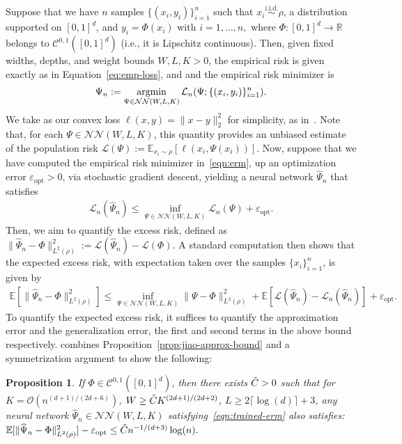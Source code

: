 \documentclass[11pt,reqno]{amsart}
\numberwithin{equation}{section}
\theoremstyle{plain}
\newtheorem{proposition}[theorem]{Proposition}
\newcommand{\E}{\mathbb{E}}
\newcommand{\R}{\mathbb{R}}
\newcommand{\calC}{{\mathcal C}}
\newcommand{\calL}{{\mathcal L}}
\newcommand{\calO}{{\mathcal O}}
\newcommand{\NN}{{\mathcal N \mathcal N}}
\newcommand{\argmin}{\mathop{\rm argmin}}
\newcommand{\1}{\boldsymbol{\mathbbm{1}}}
\begin{document}
Suppose that we have $n$ samples $\{(x_i, y_i)\}_{i = 1}^n$ such that $x_i \overset{\text{i.i.d.}}{\sim} \rho$, a distribution supported on $[0,1]^d$, and
$
    y_i = \Phi(x_i)$ with $i = 1, \ldots, n,
$
where $\Phi : [0,1]^d \to \R$ belongs to $\calC^{0, 1}([0,1]^d)$ (i.e., it is Lipschitz continuous). Then, given fixed widths, depths, and weight bounds $W, L, K > 0$, the empirical risk is given exactly as in Equation~\eqref{eq:emp-loss}, and
and the empirical risk minimizer is
\begin{align}
    \label{eqn:erm}
    \Psi_n := \argmin_{\Psi \in \NN(W, L, K)} \calL_n(\Psi; \{(x_i, y_i)\}_{i = 1}^n).
\end{align}
We take as our convex loss $\ell(x, y) = \|x - y\|_2^2$ for simplicity, as in~\citep{Jiao2023}. Note that, for each $\Psi \in \NN(W, L, K)$, this quantity provides an unbiased estimate of the population risk $\calL(\Psi) := \E_{x_i \sim \rho}[\ell(x_i, \Psi(x_i))]$. Now, suppose that we have computed the empirical risk minimizer in~\eqref{eqn:erm}, up an optimization error $\varepsilon_{\mathrm{opt}} > 0$, via stochastic gradient descent, yielding a neural network $\widehat{\Psi}_n$ that satisfies
\begin{align}
\label{eqn:trained-erm}
    \calL_n(\widehat{\Psi}_n) \leq \inf_{\Psi \in \NN(W, L, K)} \calL_n(\Psi) + \varepsilon_{\mathrm{opt}}.
\end{align}
Then, we aim to quantify the excess risk, defined as $\|\widehat{\Psi}_n - \Phi\|_{L^2(\rho)}^2 := \calL(\widehat{\Psi}_n) - \calL(\Phi)$.
A standard computation then shows that the expected excess risk, with expectation taken over the samples $\{x_i\}_{i=1}^n$, is given by
\begin{align*}
     \E[\|\widehat{\Psi}_n - \Phi\|_{L^2(\rho)}^2] \leq \inf_{\Psi \in \NN(W, L, K)} \|\Psi - \Phi\|_{L^2(\rho)}^2 + \E[\calL(\widehat{\Psi}_n) - \calL_n(\widehat{\Psi}_n)] + \varepsilon_{\mathrm{opt}}.
\end{align*}
To quantify the expected excess risk, it suffices to quantify the approximation error and the generalization error, the first and second terms in the above bound respectively. \cite[Theorem 4.1]{Jiao2023} combines Proposition~\ref{prop:jiao-approx-bound} and a symmetrization argument to show the following:
\begin{proposition}
\label{prop:jiao-generalization-unregularized}
If $\Phi \in \calC^{0, 1}([0,1]^d)$, then there exists $\Tilde{C} > 0$ such that for $K = \calO(n^{(d + 1) / (2d + 6)})$, $W \geq \Tilde{C} K^{(2d + 1) / (2d + 2)}$, $L \geq 2 \lceil \log(d)\rceil + 3$, any neural network $\widehat{\Psi}_n \in \NN(W, L, K)$ satisfying~\eqref{eqn:trained-erm} also satisfies: 
$
    \E[\|\widehat{\Psi}_n - \Phi\|_{L^2(\rho)}^2] - \varepsilon_{\mathrm{opt}} \leq \Tilde{C} n^{-1 /(d+3)}  \log(n).
$
\end{proposition}
\end{document}

